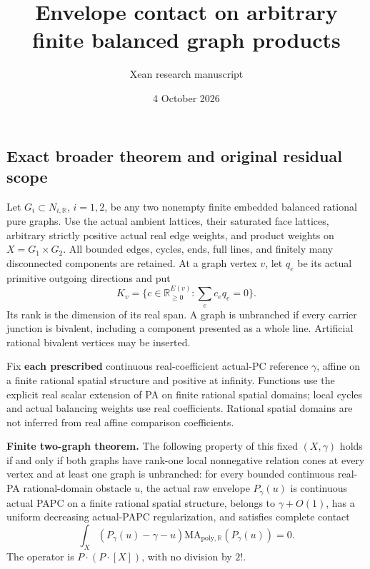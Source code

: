 \documentclass[
  11pt,
]{article}
\title{Envelope contact on arbitrary finite balanced graph products}
\author{Xean research manuscript}
\date{4 October 2026}
\begin{document}
\maketitle

\subsection{Exact broader theorem and original residual
scope}\label{exact-broader-theorem-and-original-residual-scope}

Let \(G_i\subset N_{i,\mathbb{R}}\), \(i=1,2\), be any two nonempty
finite embedded balanced rational pure graphs. Use the actual ambient
lattices, their saturated face lattices, arbitrary strictly positive
actual real edge weights, and product weights on \(X=G_1\times G_2\).
All bounded edges, cycles, ends, full lines, and finitely many
disconnected components are retained. At a graph vertex \(v\), let
\(q_e\) be its actual primitive outgoing directions and put \[
 K_v=\{c\in\mathbb{R}_{\geq0}^{E(v)}:\sum_e c_eq_e=0\}.
                                                               \tag{1}
\] Its rank is the dimension of its real span. A graph is unbranched if
every carrier junction is bivalent, including a component presented as a
whole line. Artificial rational bivalent vertices may be inserted.

Fix \textbf{each prescribed} continuous real-coefficient actual-PC
reference \(\gamma\), affine on a finite rational spatial structure and
positive at infinity. Functions use the explicit real scalar extension
of PA on finite rational spatial domains; local cycles and actual
balancing weights use real coefficients. Rational spatial domains are
not inferred from real affine comparison coefficients.

\textbf{Finite two-graph theorem.} The following
property of this fixed \((X,\gamma)\) holds if and only if both graphs
have rank-one local nonnegative relation cones at every vertex and at
least one graph is unbranched: for every bounded continuous real-PA
rational-domain obstacle \(u\), the actual raw envelope \(P_\gamma(u)\)
is continuous actual PAPC on a finite rational spatial structure,
belongs to \(\gamma+O(1)\), has a uniform decreasing actual-PAPC
regularization, and satisfies complete contact \[
 \int_X(P_\gamma(u)-\gamma-u)
       \mathrm{MA}_{\mathrm{poly},\mathbb{R}}(P_\gamma(u))=0.      \tag{2}
\] The operator is \(P\cdot(P\cdot[X])\), with no division by \(2!\).
\end{document}
